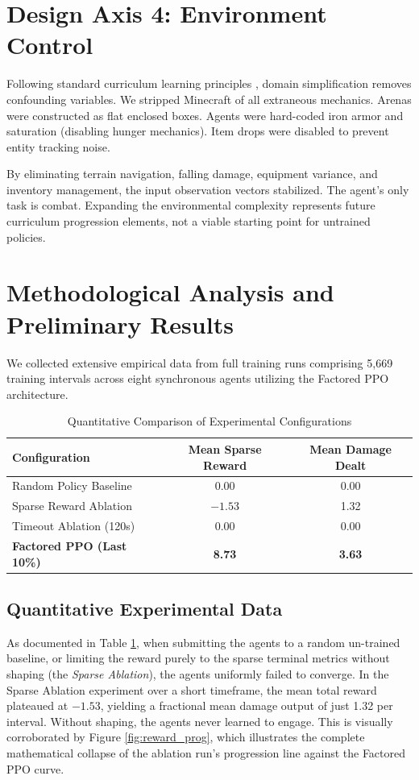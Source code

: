 \documentclass[conference]{IEEEtran}
\begin{document}
\section{Design Axis 4: Environment Control}
Following standard curriculum learning principles \cite{bengio2009curriculum}, domain simplification removes confounding variables. We stripped Minecraft of all extraneous mechanics. Arenas were constructed as flat enclosed boxes. Agents were hard-coded iron armor and saturation (disabling hunger mechanics). Item drops were disabled to prevent entity tracking noise. 

By eliminating terrain navigation, falling damage, equipment variance, and inventory management, the input observation vectors stabilized. The agent's only task is combat. Expanding the environmental complexity represents future curriculum progression elements, not a viable starting point for untrained policies.

\section{Methodological Analysis and Preliminary Results}
We collected extensive empirical data from full training runs comprising 5,669 training intervals across eight synchronous agents utilizing the Factored PPO architecture.

\begin{table}[htbp]
\centering
\caption{Quantitative Comparison of Experimental Configurations}
\label{tab:results}
\begin{tabular}{@{}lcc@{}}
\toprule
\textbf{Configuration} & \textbf{Mean Sparse Reward} & \textbf{Mean Damage Dealt} \\ \midrule
Random Policy Baseline & 0.00 & 0.00 \\ 
Sparse Reward Ablation & $-1.53$ & 1.32 \\ 
Timeout Ablation (120s) & 0.00 & 0.00 \\ 
\textbf{Factored PPO (Last 10\%)} & \textbf{8.73} & \textbf{3.63} \\ \bottomrule
\end{tabular}
\end{table}

\subsection{Quantitative Experimental Data}
As documented in Table \ref{tab:results}, when submitting the agents to a random un-trained baseline, or limiting the reward purely to the sparse terminal metrics without shaping (the \textit{Sparse Ablation}), the agents uniformly failed to converge. In the Sparse Ablation experiment over a short timeframe, the mean total reward plateaued at $-1.53$, yielding a fractional mean damage output of just 1.32 per interval. Without shaping, the agents never learned to engage. This is visually corroborated by Figure \ref{fig:reward_prog}, which illustrates the complete mathematical collapse of the ablation run's progression line against the Factored PPO curve.
\end{document}
